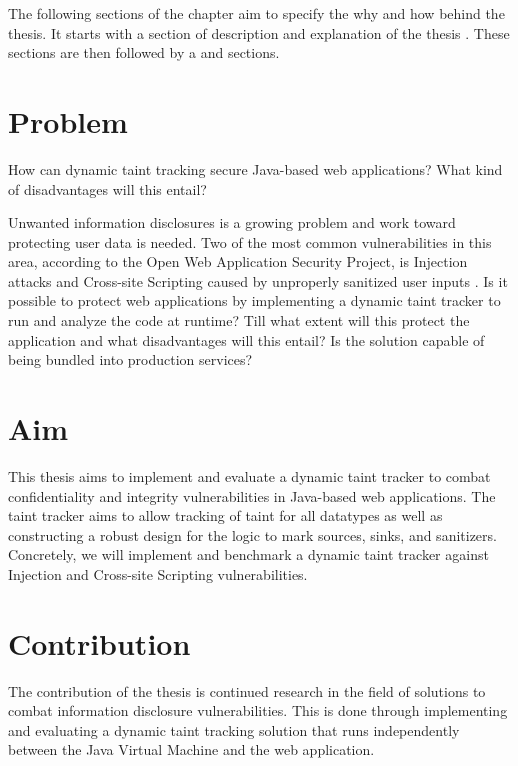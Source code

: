 The following sections of the chapter aim to specify the why and how behind the thesis. It starts with a section of \textit{} description and explanation of the thesis \textit{}. These sections are then followed by a \textit{} and \textit{} sections.



\section{Problem}
\label{Problem}
\begin{chapquote}{}
    How can dynamic taint tracking secure Java-based web applications? What kind of disadvantages will this entail?
\end{chapquote}

\noindent
Unwanted information disclosures is a growing problem and work toward protecting user data is needed. Two of the most common vulnerabilities in this area, according to the Open Web Application Security Project, is Injection attacks and Cross-site Scripting caused by unproperly sanitized user inputs \parencite{OWASP2017}. Is it possible to protect web applications by implementing a dynamic taint tracker to run and analyze the code at runtime? Till what extent will this protect the application and what disadvantages will this entail? Is the solution capable of being bundled into production services?



\section{Aim}
\label{Aim}
This thesis aims to implement and evaluate a dynamic taint tracker to combat confidentiality and integrity vulnerabilities in Java-based web applications. The taint tracker aims to allow tracking of taint for all datatypes as well as constructing a robust design for the logic to mark sources, sinks, and sanitizers. Concretely, we will implement and benchmark a dynamic taint tracker against Injection and Cross-site Scripting vulnerabilities. 



\section{Contribution}
\label{Contribution}
The contribution of the thesis is continued research in the field of solutions to combat information disclosure vulnerabilities. This is done through implementing and evaluating a dynamic taint tracking solution that runs independently between the Java Virtual Machine and the web application. 



